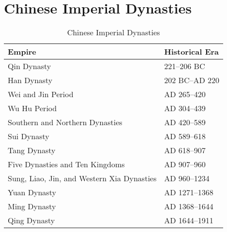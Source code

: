 \chapter{Chinese Imperial Dynasties}\label{chineseDynasties}
\fixchapterheading
	
\linespread{1.2}	
	\begin{table}[h!]
	\centering
	\caption{Chinese Imperial Dynasties} \label{chineseDynasties}
	\begin{tabular}{ll}
	\hline
	Empire&Historical Era\\
	\hline \hline
	Qin Dynasty &221--206 BC\\
	Han Dynasty &202 BC--AD 220\\
	Wei and Jin Period &AD 265--420\\
	Wu Hu Period &AD 304--439\\
	Southern and Northern Dynasties &AD 420--589\\
	Sui Dynasty &AD 589--618\\
	Tang Dynasty &AD 618--907\\
	Five Dynasties and Ten Kingdoms &AD 907--960\\
	Sung, Liao, Jin, and Western Xia Dynasties &AD 960--1234\\
	Yuan Dynasty &AD 1271--1368\\
	Ming Dynasty &AD 1368--1644\\
	Qing Dynasty &AD 1644--1911\\
	\hline
	\end{tabular}
	\end{table}
\linespread{1.9}	
